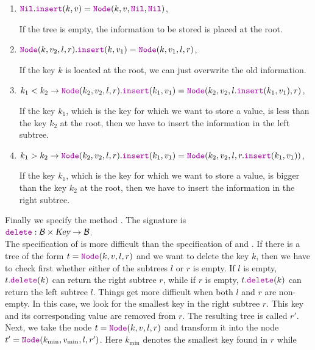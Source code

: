 \begin{enumerate}
\item $\mytt{Nil}.\mytt{insert}(k,v) = \mytt{Node}(k,v, \mytt{Nil}, \mytt{Nil})$,
  
      If the tree is empty, the information to be stored is placed at the root.
\item $\mytt{Node}(k,v_2,l,r).\mytt{insert}(k,v_1) = \mytt{Node}(k, v_1, l, r)$,

      If the key $k$ is located at the root, we can just overwrite the old information. 
\item $k_1 < k_2 \rightarrow 
         \mytt{Node}(k_2, v_2, l, r).\mytt{insert}(k_1, v_1) = \mytt{Node}(k_2, v_2, l.\mytt{insert}(k_1, v_1), r)$,

      If the key $k_1$, which is the key for which we want to store a value, is less than the key
      $k_2$ at the root, then we have to insert the information in the left subtree.
\item $k_1 > k_2 \rightarrow 
         \mytt{Node}(k_2, v_2, l, r).\mytt{insert}(k_1, v_1) = 
         \mytt{Node}(k_2, v_2, l, r.\mytt{insert}(k_1, v_1))$,

      If the key $k_1$, which is the key for which we want to store a value, is bigger than the key
      $k_2$ at the root, then we have to insert the information in the right subtree.
\end{enumerate}
Finally we specify the method  .  The signature is
\\[0.2cm]
\hspace*{1.3cm}
$\mytt{delete}: \mathcal{B} \times \textsl{Key} \rightarrow \mathcal{B}$.
\\[0.2cm]
The specification of  is more difficult than the specification of  and
. If there is a tree of the form $t =\mytt{Node}(k,v,l,r)$ and we want to delete the key $k$,
then we have to check first whether either of the subtrees  $l$ or $r$ is empty.  If $l$ is empty,
$t.\mytt{delete}(k)$ can return the right subtree  $r$, while if $r$ is empty,
$t.\mytt{delete}(k)$ can return the left subtree $l$.
Things get more difficult when both $l$ and $r$ are non-empty.  In this case,
we look for the smallest key in the right subtree $r$.
This key and its corresponding value are removed from $r$.  The resulting tree is called $r'$.
Next, we take the node $t =\mytt{Node}(k,v,l,r)$ and transform it into the node
$t'=\mytt{Node}(k_{\textrm{min}},v_{\textrm{min}},l,r')$.  Here $k_{\textrm{min}}$ denotes the smallest key found in $r$ while
